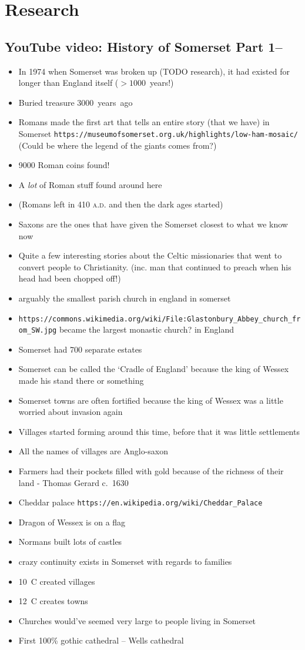 \documentclass[twocolumn]{memoir}
\begin{document}
\chapter{Research}
\section{YouTube video: History of Somerset Part 1--}
\begin{itemize}
\item In 1974 when Somerset was broken up (TODO research), it had existed for longer than England itself (\(>1000\)~years!)
\item Buried treasure 3000~years~ago
\item Romans made the first art that tells an entire story (that we have) in Somerset \verb|https://museumofsomerset.org.uk/highlights/low-ham-mosaic/| (Could be where the legend of the giants comes from?)
\item 9000 Roman coins found!
\item A \emph{lot} of Roman stuff found around here
\item (Romans left in 410 \textsc{a.d.} and then the dark ages started)
\item Saxons are the ones that have given the Somerset closest to what we know now
\item Quite a few interesting stories about the Celtic missionaries that went to convert people to Christianity. (inc. man that continued to preach when his head had been chopped off!)
\item arguably the smallest parish church in england in somerset
\item \verb|https://commons.wikimedia.org/wiki/File:Glastonbury_Abbey_church_from_SW.jpg| became the largest monastic church? in England
\item Somerset had 700 separate estates 
\item Somerset can be called the `Cradle of England' because the king of Wessex made his stand there or something
\item Somerset towns are often fortified because the king of Wessex was a little worried about invasion again
\item Villages started forming around this time, before that it was little settlements
\item All the names of villages are Anglo-saxon
\item Farmers had their pockets filled with gold because of the richness of their land - Thomas Gerard c.~1630
\item Cheddar palace \verb|https://en.wikipedia.org/wiki/Cheddar_Palace|
\item Dragon of Wessex is on a flag
\item Normans built lots of castles
\item crazy continuity exists in Somerset with regards to families
\item 10~C created villages
\item 12~C creates towns
\item Churches would've seemed very large to people living in Somerset
\item First 100\% gothic cathedral -- Wells cathedral 
\end{itemize}
\end{document}
